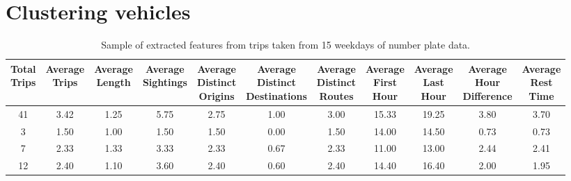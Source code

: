 \section{Clustering vehicles}\label{s.classification}

\begin{table*}[t]
\centering
\small
\begin{tabular}{c c c c c c c c c c c}
  \hline
 \thead{Total\\Trips} & \thead{Average\\Trips} & \thead{Average\\Length} & \thead{Average\\Sightings} & \thead{Average\\Distinct\\Origins} & \thead{Average\\Distinct\\Destinations} & \thead{Average\\Distinct\\Routes} & \thead{Average\\First\\Hour} & \thead{Average\\Last\\Hour} & \thead{Average\\Hour\\Difference} & \thead{Average\\Rest\\Time} \\
  \hline
41 & 3.42 & 1.25 & 5.75 & 2.75 & 1.00 & 3.00 & 15.33 & 19.25 & 3.80 & 3.70 \\
3 & 1.50 & 1.00 & 1.50 & 1.50 & 0.00 & 1.50 & 14.00 & 14.50 & 0.73 & 0.73 \\
7 & 2.33 & 1.33 & 3.33 & 2.33 & 0.67 & 2.33 & 11.00 & 13.00 & 2.44 & 2.41 \\
12 & 2.40 & 1.10 & 3.60 & 2.40 & 0.60 & 2.40 & 14.40 & 16.40 & 2.00 & 1.95 \\
   \hline
\end{tabular}
\caption{Sample of extracted features from trips taken from 15 weekdays of number plate data.}
\label{t:features}
\end{table*}

